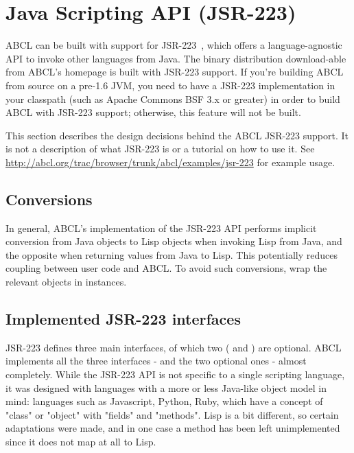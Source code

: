 \documentclass[10pt]{book}
\begin{document}
\section{Java Scripting API (JSR-223)}
\label{sec:java-scripting-api}

ABCL can be built with support for JSR-223~\cite{jsr-223}, which offers
a language-agnostic API to invoke other languages from Java. The binary
distribution download-able from ABCL's homepage is built with JSR-223
support. If you're building ABCL from source on a pre-1.6 JVM, you need
to have a JSR-223 implementation in your classpath (such as Apache
Commons BSF 3.x or greater) in order to build ABCL with JSR-223 support;
otherwise, this feature will not be built.

This section describes the design decisions behind the ABCL JSR-223
support. It is not a description of what JSR-223 is or a tutorial on
how to use it. See
\url{http://abcl.org/trac/browser/trunk/abcl/examples/jsr-223}
for example usage.

\subsection{Conversions}

In general, ABCL's implementation of the JSR-223 API performs implicit
conversion from Java objects to Lisp objects when invoking Lisp from
Java, and the opposite when returning values from Java to Lisp. This
potentially reduces coupling between user code and ABCL. To avoid such
conversions, wrap the relevant objects in  instances.

\subsection{Implemented JSR-223 interfaces}

JSR-223 defines three main interfaces, of which two (
and ) are optional. ABCL implements all the three
interfaces -  and the two optional ones - almost
completely. While the JSR-223 API is not specific to a single scripting
language, it was designed with languages with a more or less Java-like
object model in mind: languages such as Javascript, Python, Ruby, which
have a concept of "class" or "object" with "fields" and "methods". Lisp
is a bit different, so certain adaptations were made, and in one case a
method has been left unimplemented since it does not map at all to Lisp.
\end{document}
